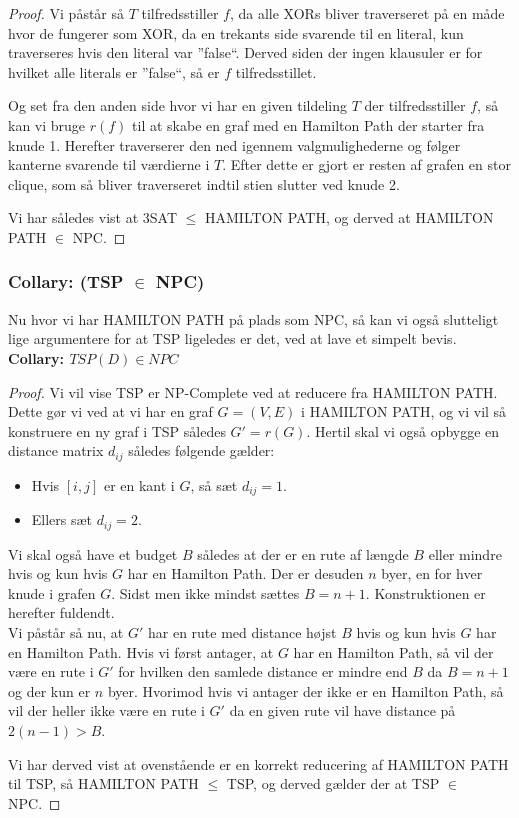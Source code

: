 \begin{proof}
Vi påstår så $T$ tilfredsstiller $f$, da alle XORs bliver traverseret på en
måde hvor de fungerer som XOR, da en trekants side svarende til en literal, kun
traverseres hvis den literal var ''false``. Derved siden der ingen klausuler er
for hvilket alle literals er ''false``, så er $f$ tilfredsstillet.

Og set fra den anden side hvor vi har en given tildeling $T$ der
tilfredsstiller $f$, så kan vi bruge $r(f)$ til at skabe en graf med en
Hamilton Path der starter fra knude 1. Herefter traverserer den ned igennem
valgmulighederne og følger kanterne svarende til værdierne i $T$. Efter dette
er gjort er resten af grafen en stor clique, som så bliver traverseret indtil
stien slutter ved knude 2.

Vi har således vist at 3SAT $\leq$ HAMILTON PATH, og derved at HAMILTON PATH
$\in$ NPC.
\end{proof}


\subsubsection{Collary: (TSP $\in$ NPC)}

Nu hvor vi har HAMILTON PATH på plads som NPC, så kan vi også slutteligt lige
argumentere for at TSP ligeledes er det, ved at lave et  simpelt bevis.\\

\textbf{Collary: $TSP(D) \in NPC$}

\begin{proof}
 Vi vil vise TSP er NP-Complete ved at reducere fra HAMILTON PATH. Dette gør vi
 ved at vi har en graf $G=(V,E)$ i HAMILTON PATH, og vi vil så konstruere en ny
 graf i TSP således $G' = r(G)$. Hertil skal vi også opbygge en distance matrix
 $d_{ij}$ således følgende gælder:

\begin{itemize}
 \item Hvis $[i,j]$ er en kant i $G$, så sæt $d_{ij}=1$.
 \item Ellers sæt $d_{ij}=2$.
\end{itemize}

Vi skal også have et budget $B$ således at der er en rute af længde $B$ eller
mindre hvis og kun hvis $G$ har en Hamilton Path. Der er desuden $n$ byer, en
for hver knude i grafen $G$. Sidst men ikke mindst sættes $B=n+1$.
Konstruktionen er herefter fuldendt.\\

Vi påstår så nu, at $G'$ har en rute med distance højst $B$ hvis og kun hvis
$G$ har en Hamilton Path. Hvis vi først antager, at $G$ har en Hamilton Path,
så vil der være en rute i $G'$ for hvilken den samlede distance er mindre end
$B$ da $B=n+1$ og der kun er $n$ byer. Hvorimod hvis vi antager der ikke er en
Hamilton Path, så vil der heller ikke være en rute i $G'$ da en given rute vil
have distance på $2(n-1) > B$.

Vi har derved vist at ovenstående er en korrekt reducering af HAMILTON PATH til
TSP, så HAMILTON PATH $\leq$ TSP, og derved gælder der at TSP $\in$ NPC.
\end{proof}
